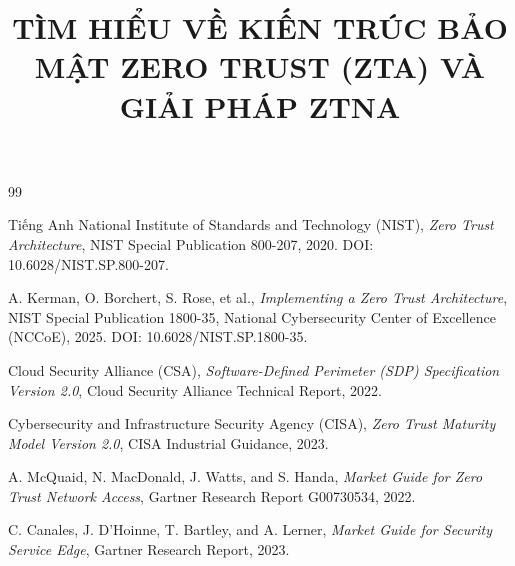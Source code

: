\documentclass{uetgraduation}
\title{TÌM HIỂU VỀ KIẾN TRÚC BẢO MẬT ZERO TRUST (ZTA) VÀ GIẢI PHÁP ZTNA}
\begin{document}
\makecovers


























\begin{thebibliography}{99}

    \begin{bibsection}{Tiếng Anh}
        National Institute of Standards and Technology (NIST),
        \textit{Zero Trust Architecture},
        NIST Special Publication 800-207, 2020.
        DOI: 10.6028/NIST.SP.800-207.

        A. Kerman, O. Borchert, S. Rose, et al.,
        \textit{Implementing a Zero Trust Architecture},
        NIST Special Publication 1800-35, National Cybersecurity Center of Excellence (NCCoE), 2025.
        DOI: 10.6028/NIST.SP.1800-35.

        Cloud Security Alliance (CSA),
        \textit{Software-Defined Perimeter (SDP) Specification Version 2.0},
        Cloud Security Alliance Technical Report, 2022.

        Cybersecurity and Infrastructure Security Agency (CISA),
        \textit{Zero Trust Maturity Model Version 2.0},
        CISA Industrial Guidance, 2023.

        A. McQuaid, N. MacDonald, J. Watts, and S. Handa,
        \textit{Market Guide for Zero Trust Network Access},
        Gartner Research Report G00730534, 2022.

        C. Canales, J. D'Hoinne, T. Bartley, and A. Lerner,
        \textit{Market Guide for Security Service Edge},
        Gartner Research Report, 2023.


\end{bibsection}
\end{thebibliography}
\end{document}
